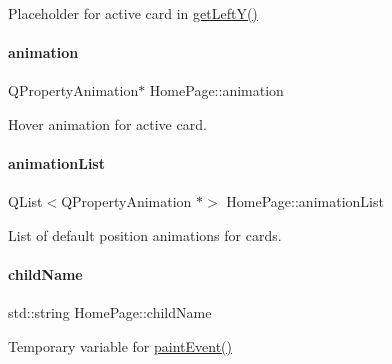 Placeholder for active card in \mbox{\hyperlink{classHomePage_a38c909855e6b1e1a0739642949aa4f9a}{get\+Left\+Y()}} 

\mbox{\label{classHomePage_a3393be0eee7c46695fd059cc6a4fdfc7}} 
\paragraph{\texorpdfstring{animation}{animation}}
{\footnotesize\ttfamily Q\+Property\+Animation$\ast$ Home\+Page\+::animation\hspace{0.3cm}{\ttfamily [private]}}



Hover animation for active card. 

\mbox{\label{classHomePage_afe801a94e5ae4b4f136a022bf3410411}} 
\paragraph{\texorpdfstring{animationList}{animationList}}
{\footnotesize\ttfamily Q\+List$<$Q\+Property\+Animation $\ast$$>$ Home\+Page\+::animation\+List\hspace{0.3cm}{\ttfamily [private]}}



List of default position animations for cards. 

\mbox{\label{classHomePage_a07abacb59d135ac5770492ac5ca0e0cf}} 
\paragraph{\texorpdfstring{childName}{childName}}
{\footnotesize\ttfamily std\+::string Home\+Page\+::child\+Name\hspace{0.3cm}{\ttfamily [private]}}



Temporary variable for \mbox{\hyperlink{classHomePage_ab3daab17f753e46efcec8968333f88b5}{paint\+Event()}} 

\mbox{\label{classHomePage_a0f7d1602b0aa49fbea7693e921e8ab07}} 
